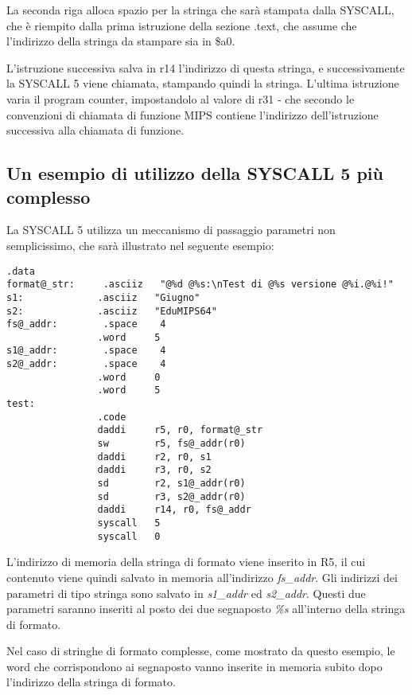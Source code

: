 \documentclass[letterpaper,10pt,italian]{sphinxmanual}
\begin{document}
La seconda riga alloca spazio per la stringa che sarà stampata dalla SYSCALL,
che è riempito dalla prima istruzione della sezione .text, che assume che
l'indirizzo della stringa da stampare sia in \$a0.

L'istruzione successiva salva in r14 l'indirizzo di questa stringa, e
successivamente la SYSCALL 5 viene chiamata, stampando quindi la stringa.
L'ultima istruzione varia il program counter, impostandolo al valore di r31 -
che secondo le convenzioni di chiamata di funzione MIPS contiene l'indirizzo
dell'istruzione successiva alla chiamata di funzione.


\subsection{Un esempio di utilizzo della SYSCALL 5 più complesso}
\label{examples:un-esempio-di-utilizzo-della-syscall-5-piu-complesso}
La SYSCALL 5 utilizza un meccanismo di passaggio parametri non semplicissimo,
che sarà illustrato nel seguente esempio:

\begin{Verbatim}[commandchars=@\[\]]
                .data
format@_str:     .asciiz   "@%d @%s:\nTest di @%s versione @%i.@%i!"
s1:             .asciiz   "Giugno"
s2:             .asciiz   "EduMIPS64"
fs@_addr:        .space    4
                .word     5
s1@_addr:        .space    4
s2@_addr:        .space    4
                .word     0
                .word     5
test:
                .code
                daddi     r5, r0, format@_str
                sw        r5, fs@_addr(r0)
                daddi     r2, r0, s1
                daddi     r3, r0, s2
                sd        r2, s1@_addr(r0)
                sd        r3, s2@_addr(r0)
                daddi     r14, r0, fs@_addr
                syscall   5
                syscall   0
\end{Verbatim}

L'indirizzo di memoria della stringa di formato viene inserito in R5, il cui
contenuto viene quindi salvato in memoria all'indirizzo \emph{fs\_addr}. Gli
indirizzi dei parametri di tipo stringa sono salvato in \emph{s1\_addr} ed
\emph{s2\_addr}. Questi due parametri saranno inseriti al posto dei due segnaposto
\emph{\%s} all'interno della stringa di formato.

Nel caso di stringhe di formato complesse, come mostrato da questo esempio, le
word che corrispondono ai segnaposto vanno inserite in memoria subito dopo
l'indirizzo della stringa di formato.



\renewcommand{\indexname}{Indice}
\printindex
\end{document}

